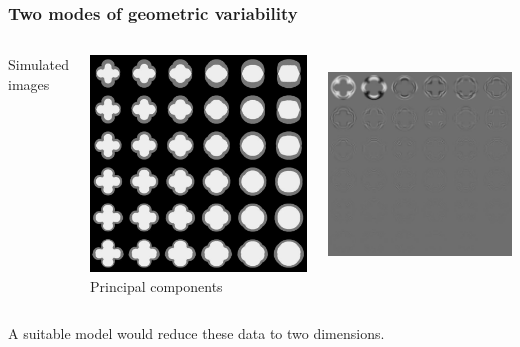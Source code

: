 \documentclass{beamer}
\begin{document}
\begin{frame}
\frametitle{Two modes of geometric variability}
\begin{columns}[c]
Simulated images\par
\includegraphics[height=0.9\textwidth]{things}
Principal components\par
\includegraphics[height=0.9\textwidth]{things_pca}
\end{columns}
A suitable model would reduce these data to two dimensions.
\end{frame}
\end{document}
